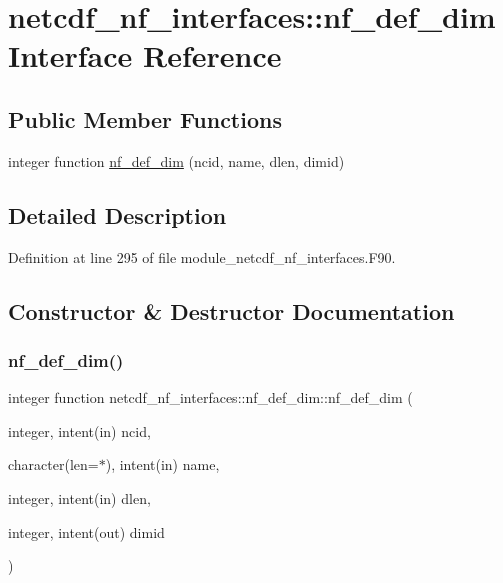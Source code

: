 \hypertarget{interfacenetcdf__nf__interfaces_1_1nf__def__dim}{}\section{netcdf\+\_\+nf\+\_\+interfaces\+:\+:nf\+\_\+def\+\_\+dim Interface Reference}
\label{interfacenetcdf__nf__interfaces_1_1nf__def__dim}
\subsection*{Public Member Functions}
\begin{DoxyCompactItemize}
\item 
integer function \hyperlink{interfacenetcdf__nf__interfaces_1_1nf__def__dim_aed824819a989a6aed2836ef208c9c4ea}{nf\+\_\+def\+\_\+dim} (ncid, name, dlen, dimid)
\end{DoxyCompactItemize}


\subsection{Detailed Description}


Definition at line 295 of file module\+\_\+netcdf\+\_\+nf\+\_\+interfaces.\+F90.



\subsection{Constructor \& Destructor Documentation}
\mbox{\label{interfacenetcdf__nf__interfaces_1_1nf__def__dim_aed824819a989a6aed2836ef208c9c4ea}} 
\subsubsection{\texorpdfstring{nf\+\_\+def\+\_\+dim()}{nf\_def\_dim()}}
{\footnotesize\ttfamily integer function netcdf\+\_\+nf\+\_\+interfaces\+::nf\+\_\+def\+\_\+dim\+::nf\+\_\+def\+\_\+dim (\begin{DoxyParamCaption}\item[{integer, intent(in)}]{ncid,  }\item[{character(len=$\ast$), intent(in)}]{name,  }\item[{integer, intent(in)}]{dlen,  }\item[{integer, intent(out)}]{dimid }\end{DoxyParamCaption})}



